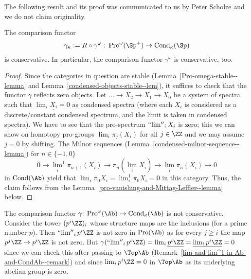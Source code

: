 \documentclass[colorinlistoftodos,article,11pt,reqno]{article}
\newcommand{\Pro}{\textup{Pro}}
\newcommand{\Cond}{\textup{Cond}}
\renewcommand{\to}[1][]{\overset{#1}{\rightarrow}}
\newcommand{\To}[1][]{\overset{#1}{\longrightarrow}}
\DeclareMathOperator*{\prolim}{``lim''}
\begin{document}
\begin{appendix}
The following result and its proof was communicated to us by Peter Scholze and we do not claim originality. 

\begin{thm} \label{comparison-conservative--thm}
The comparison functor 
\[ \gamma_\kappa := R\circ\gamma^\omega \,\colon\, \Pro^\omega(\Sp^+) \to \Cond_\kappa(\Sp) \]
is conservative.
In particular, the comparison functor $\gamma^\omega$ is conservative, too.

\end{thm}
\begin{proof}
Since the categories in question are stable (Lemma~\ref{Pro-omega-stable--lemma} and Lemma~\ref{condensed-objects-stable--lem}), it suffices to check that the functor $\gamma$ reflects zero objects. Let $\ldots\to X_2 \to X_1 \to X_0$ be a
system of spectra such that $\lim_i\underline{X_i} = 0$ as condensed spectra (where each
$X_i$ is considered as a discrete/constant condensed spectrum, and the
limit is taken in condensed spectra). 
We have to see that the pro-spectrum $\prolim_iX_i$ is zero; this we can show on homotopy pro-groups $\lim_i\pi_j(X_i)$ for all $j\in\ZZ$ \cite[2.8]{kst-i} and we may assume $j=0$ by shifting. The Milnor sequences (Lemma~\ref{condensed-milnor-sequence--lemma}) for $n\in\{-1,0\}$
\[
0 \To {\lim_i}^1\pi_{n+1}(X_i) \To \pi_n(\lim_iX_i) \To \lim_i\pi_n(X_i) \To 0
\]
in $\Cond(\Ab)$ yield that $\lim_i \pi_0 X_i = \lim_i^1 \pi_0 X_i = 0$ in this category. Thus, the claim follows from the Lemma~\ref{pro-vanishing-and-Mittag-Leffler--lemma} below.
\end{proof}


\begin{remark}
The comparison functor $\gamma\colon\Pro^\omega(\Ab)\to\Cond_\kappa(\Ab)$ is not conservative. Consider the tower $(p^i\ZZ)_i$ whose structure maps are the inclusions (for a prime number $p$). Then $\prolim_ip^i\ZZ$ is not zero in $\Pro(\Ab)$ as for every $j\geq i$ the map $p^j\ZZ \to p^i\ZZ$ is not zero. But $\gamma(\prolim_ip^i\ZZ) = \lim_i\underline{p^i\ZZ} = \underline{\lim_ip^i\ZZ} =0$ since we can check this after passing to $\Top\Ab$ (Remark~\ref{lim-and-lim^1-in-Ab-and-CondAb--remark}) and since $\lim_ip^i\ZZ=0$ in $\Top\Ab$ as its underlying abelian group is zero.
\end{remark}


\end{appendix}
\end{document}
